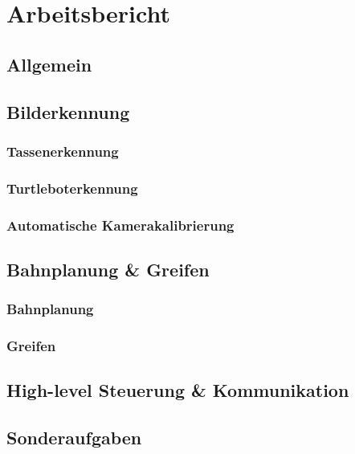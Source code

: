 \documentclass[de,ids]{fziartcl}
\begin{document}
\section{Arbeitsbericht} %
\subsection{Allgemein}
\subsection{Bilderkennung}
\subsubsection{Tassenerkennung}
\label{3-1-1_arbeitsbericht_tassenerkennung}
\subsubsection{Turtleboterkennung}
\subsubsection{Automatische Kamerakalibrierung}
\subsection{Bahnplanung \& Greifen}
\subsubsection{Bahnplanung}
\subsubsection{Greifen}

\subsection{High-level Steuerung \& Kommunikation}

\subsection{Sonderaufgaben}
\end{document}
